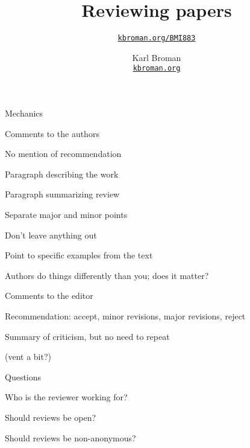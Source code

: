 \documentclass[aspectratio=169,12pt,t]{beamer}
\title{Reviewing papers}
\subtitle{}
\author{\href{https://kbroman.org/BMI883}{\tt kbroman.org/BMI883} }
\institute{}
\date{\small \hspace{3in} Karl Broman \\
  \hspace{3in} \href{https://kbroman.org}{\color{foreground}
    \small \tt kbroman.org}}
\begin{document}
{
\frame{
  \titlepage
} }



\begin{frame}{Mechanics}


  \bbi
\item Comments to the authors
  \bi
\item No mention of recommendation
\item Paragraph describing the work
\item Paragraph summarizing review
\item Separate major and minor points
\item Don't leave anything out
\item Point to specific examples from the text
\item Authors do things differently than you; {\hilit does it matter}?
  \ei
\item Comments to the editor
  \bi
  \item Recommendation: accept, minor revisions, major revisions, reject
  \item Summary of criticism, but no need to repeat
  \item (vent a bit?)
  \ei
  \ei

\end{frame}



\begin{frame}{Questions}


  \bbi
\item Who is the reviewer working for?
\item Should reviews be open?
\item Should reviews be non-anonymous?
  \ei

\end{frame}
\end{document}
